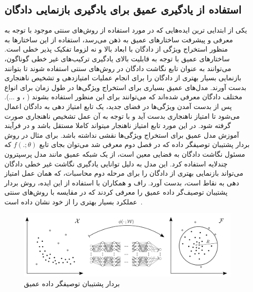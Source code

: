 \documentclass[12pt,a4paper]{report}
\begin{document}
	\subsection{استفاده از یادگیری عمیق برای یادگیری بازنمایی دادگان}
یکی از ابتدایی ترین ایده‌هایی که در مورد استفاده از روش‌های سنتی موجود با توجه به معرفی و پیشرفت ساختار‌های عمیق به ذهن می‌رسد، استفاده از این ساختار‌ها به منظور استخراج ویژگی از دادگان با ابعاد بالا و نه لزوما تفکیک پذیر خطی است. ساختار‌های عمیق با توجه به قابلیت بالای یادگیری ترکیب‌های غیر خطی گوناگون، می‌توانند به عنوان تابع نگاشت دادگان در روش‌های سنتی استفاده شوند تا بتوانند بازنمایی بسیار بهتری از دادگان را برای انجام عملیات امتیازدهی و تشخیص ناهنجاری بدست آورند.
مدل‌های عمیق بسیاری برای استخراج ویژگی‌ها در طول زمان برای انواع مختلف دادگان معرفی شده‌اند که می‌توانند برای این منظور استفاده بشوند
( 
،
و
...).
پس از بدست آمدن ویژگی‌ها در فضای جدید، یک تابع امتیاز دهی به دادگان اعمال می‌شود تا امتیاز ناهنجاری بدست آید و با توجه به آن عمل تشخیص ناهنجاری صورت گرفته شود. در این مورد تابع امتیاز ناهنجار میتواند کاملا مستقل باشد و در فرآیند آموزش مدل عمیق برای استخراج ویژگی‌ها نقشی نداشته باشد.
برای مثال در روش بردار پشتیبان توصیفگر داده که در فصل دوم معرفی شد می‌توان بجای تابع $f(.;\theta)$ که مسئول نگاشت دادگان به فضایی معین است، از یک شبکه عمیق مانند مدل پرسپترون چندلایه استفاده کرد. این مدل به دلیل توانایی یادگیری نگاشت غیر خطی دادگان می‌تواند بازنمایی بهتری از دادگان را برای مرحله دوم محاسبات، که همان عمل امتیاز دهی به نقاط است، بدست آورد. راف و همکاران با استفاده از این ایده، روش بردار پشتیبان توصیف‌گر داده عمیق را معرفی کردند که در مقایسه با روش‌های سنتی عملکرد بسیار بهتری را از خود نشان داده است~\cite{pmlr-v80-ruff18a}.

\begin{figure}[!h]
	\begin{center}
		\includegraphics[width=\linewidth]{./images/figures/deep-svdd.png}
	\end{center}
	\caption{بردار پشتیبان توصیفگر داده عمیق~\cite{pmlr-v80-ruff18a}}
	\label{fig:deep-svdd}
	\centering
\end{figure}
\end{document}
